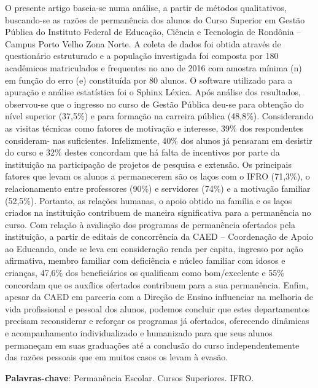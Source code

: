 \documentclass[article,12pt,onesidea,4paper,english,brazil]{abntex2}
\begin{document}
	\noindent O presente artigo baseia-se numa análise, a partir de métodos qualitativos,
	buscando-se as razões de permanência dos alunos do Curso Superior em Gestão
	Pública do Instituto Federal de Educação, Ciência e Tecnologia de Rondônia –
	Campus Porto Velho Zona Norte. A coleta de dados foi obtida através de
	questionário estruturado e a população investigada foi composta por 180
	acadêmicos matriculados e frequentes no ano de 2016 com amostra mínima (n) em
	função do erro (e) constituída por 80 alunos. O software utilizado para a apuração e
	análise estatística foi o Sphinx Léxica. Após análise dos resultados, observou-se que
	o ingresso no curso de Gestão Pública deu-se para obtenção do nível superior
	(37,5\%) e para formação na carreira pública (48,8\%). Considerando as visitas
	técnicas como fatores de motivação e interesse, 39\% dos respondentes consideram-
	nas suficientes. Infelizmente, 40\% dos alunos já pensaram em desistir do curso e
	32\% destes concordam que há falta de incentivos por parte da instituição na
	participação de projetos de pesquisa e extensão. Os principais fatores que levam os
	alunos a permanecerem são os laços com o IFRO (71,3\%), o relacionamento entre
	professores (90\%) e servidores (74\%) e a motivação familiar (52,5\%). Portanto, as
	relações humanas, o apoio obtido na família e os laços criados na instituição
	contribuem de maneira significativa para a permanência no curso. Com relação à
	avaliação dos programas de permanência ofertados pela instituição, a partir de
	editais de concorrência da CAED – Coordenação de Apoio ao Educando, onde se
	leva em consideração renda per capita, ingresso por ação afirmativa, membro
	familiar com deficiência e núcleo familiar com idosos e crianças, 47,6\% dos
	beneficiários os qualificam como bom/excelente e 55\% concordam que os auxílios
	ofertados contribuem para a sua permanência. Enfim, apesar da CAED em parceria
	com a Direção de Ensino influenciar na melhoria de vida profissional e pessoal dos
	alunos, podemos concluir que estes departamentos precisam reconsiderar e reforçar
	os programas já ofertados, oferecendo dinâmicas e acompanhamento
	individualizado e humanizado para que seus alunos permaneçam em suas
	graduações até a conclusão do curso independentemente das razões pessoais que
	em muitos casos os levam à evasão.
	
	\vspace{\onelineskip}
	
	\noindent
	\textbf{Palavras-chave}: Permanência Escolar. Cursos Superiores. IFRO.
\end{document}
